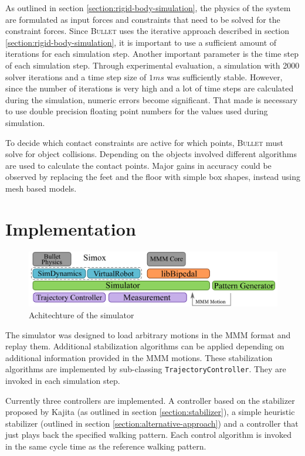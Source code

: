 \documentclass[english,ngerman]{KITreprt}
\newcommand{\name}[1]{\textsc{#1}}
\begin{document}
As outlined in section \ref{section:rigid-body-simulation}, the physics
of the system are formulated as input forces and constraints that need
to be solved for the constraint forces. Since \name{Bullet} uses the
iterative approach described in section
\ref{section:rigid-body-simulation}, it is important to use a sufficient
amount of iterations for each simulation step. Another important
parameter is the time step of each simulation step. Through experimental
evaluation, a simulation with 2000 solver iterations and a time step
size of $1 ms$ was sufficiently stable. However, since the number of
iterations is very high and a lot of time steps are calculated during
the simulation, numeric errors become significant. That made is
necessary to use double precision floating point numbers for the values
used during simulation.

To decide which contact constraints are active for which points,
\name{Bullet} must solve for object collisions. Depending on the objects
involved different algorithms are used to calculate the contact points.
Major gains in accuracy could be observed by replacing the feet and the
floor with simple box shapes, instead using mesh based models.

\section{Implementation}\label{implementation-3}

\begin{figure}[htb]
\vspace*{-1em}
\includegraphics[width=\textwidth]{images/architechture.png}
\caption{Achitechture of the simulator}
\label{img:simulator-achitechture}
\end{figure}

The simulator was designed to load arbitrary motions in the \name{MMM}
format and replay them. Additional stabilization algorithms can be
applied depending on additional information provided in the \name{MMM}
motions. These stabilization algorithms are implemented by sub-classing
\texttt{TrajectoryController}. They are invoked in each simulation step.

Currently three controllers are implemented. A controller based on the
stabilizer proposed by Kajita (as outlined in section
\ref{section:stabilizer}), a simple heuristic stabilizer (outlined in
section \ref{section:alternative-approach}) and a controller that just
plays back the specified walking pattern. Each control algorithm is
invoked in the same cycle time as the reference walking pattern.
\end{document}
